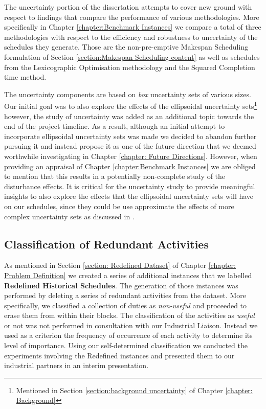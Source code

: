 \vspace{\baselineskip}
\noindent
The uncertainty portion of the dissertation attempts to cover new ground with respect to findings that compare the performance of various methodologies. More specifically in Chapter \ref{chapter:Benchmark Instances} we compare a total of three methodologies with respect to the efficiency and robustness to uncertainty of the schedules they generate. Those are the non-pre-emptive Makespan Scheduling formulation of Section \ref{section:Makespan Scheduling-content} as well as schedules from the Lexicographic Optimisation methodology and the Squared Completion time method.  

\vspace{\baselineskip}
\noindent
The uncertainty components are based on \textit{box} uncertainty sets of various sizes. Our initial goal was to also explore the effects of the ellipsoidal uncertainty sets\footnote{Mentioned in Section \ref{section:background uncertainty} of Chapter \ref{chapter: Background}} however, the study of uncertainty was added as an additional topic towards the end of the project timeline. As a result, although an initial attempt to incorporate ellipsoidal uncertainty sets was made we decided to abandon further pursuing it and instead propose it as one of the future direction that we deemed worthwhile investigating in Chapter \ref{chapter: Future Directions}. However, when providing an appraisal of Chapter \ref{chapter:Benchmark Instances} we are obliged to mention that this results in a potentially non-complete study of the disturbance effects. It is critical for the uncertainty study to provide meaningful insights to also explore the effects that the ellipsoidal uncertainty sets will have on our schedules, since they could be use approximate the effects of more complex uncertainty sets as discussed in \cite{vertsimas}.

\subsection*{Classification of Redundant Activities}
As mentioned in Section \ref{section: Redefined Dataset} of Chapter \ref{chapter: Problem Definition} we created a series of additional instances that we labelled \textbf{Redefined Historical Schedules}. The generation of those instances was performed by deleting a series of redundant activities from the dataset. More specifically, we classified a collection of duties as \textit{non-useful} and proceeded to erase them from within their blocks. The classification of the activities as \textit{useful} or not was not performed in consultation with our Industrial Liaison. Instead we used as a criterion the frequency of occurrence of each activity to determine its level of importance. Using our self-determined classification we conducted the experiments involving the Redefined instances and presented them to our industrial partners in an interim presentation. 

